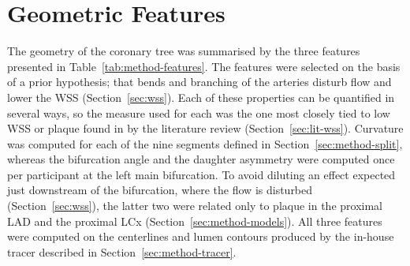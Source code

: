 \providecommand{\clarify}[1]{\textcolor{red}{\textbf{Clarification needed:} #1}}
\section{Geometric Features}
\label{sec:method-features}

The geometry of the coronary tree was summarised by the three features presented in Table~\ref{tab:method-features}.
The features were selected on the basis of a prior hypothesis; that bends and branching of the arteries disturb flow and lower the WSS (Section~\ref{sec:wss}).
Each of these properties can be quantified in several ways, so the measure used for each was the one most closely tied to low WSS or plaque found in by the literature review (Section~\ref{sec:lit-wss}).
Curvature was computed for each of the nine segments defined in Section~\ref{sec:method-split}, whereas the bifurcation angle and the daughter asymmetry were computed once per participant at the left main bifurcation.
To avoid diluting an effect expected just downstream of the bifurcation, where the flow is disturbed (Section~\ref{sec:wss}), the latter two were related only to plaque in the proximal LAD and the proximal LCx (Section~\ref{sec:method-models}).
All three features were computed on the centerlines and lumen contours produced by the in-house tracer described in Section~\ref{sec:method-tracer}.

